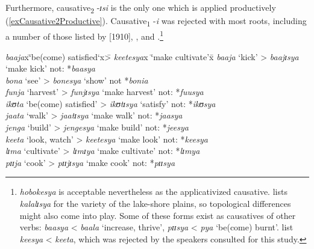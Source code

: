 Furthermore, causative\textsubscript{2} -\textit{ɪsi} is the only one which is applied productively (\ref{exCausative2Productive}). Causative\textsubscript{1} \mbox{-\textit{i}} was rejected with most roots, including a number of those listed by \citet{MeinhofC1966}[1910], \citet{SchumannK1899}, and \citet{EndemannC1914}.\footnote{\textit{hobokesya} is acceptable nevertheless as the applicativized causative. \citet{FelbergK1996} lists \textit{kalalɪsya} for the variety of the lake-shore plains, so topological differences might also come into play. Some of these forms exist as causatives of other verbs: \textit{baasya} < \textit{baala} \lq increase, thrive', \textit{pɪɪsya} < \textit{pya} \lq be(come) burnt'. \citet{MwangokaNVoorhoeveJ1960c} list \textit{keesya} < \textit{keeta}, which was rejected by the speakers consulted for this study.} 

\begin{exe}
\ex \label{exCausative2Productive}
\begin{tabbing}
\textit{baaja}x\= \lq be(come) satisfied\lq x\= > \textit{keetesya}x \= \lq make cultivate'x\= \kill %
\textit{baaja} \> \lq kick' \> > \textit{baajɪsya} \> \lq make kick' \> not: *\textit{baasya}\\
\textit{bona} \> \lq see' \> > \textit{bonesya} \> \lq show' \> not *\textit{bonia}\\%
\textit{funja} \> \lq harvest' \> > \textit{funjɪsya} \> \lq make harvest' \> not: *\textit{fuusya}\\%
\textit{ikʊta} \> \lq be(come) satisfied' \> > \textit{ikʊtɪsya} \> \lq satisfy' \> not: *\textit{ikʊsya}\\
\textit{jaata} \> \lq walk' \> > \textit{jaatɪsya} \> \lq make walk' \> not: *\textit{jaasya}\\
\textit{jenga} \> \lq build' \> > \textit{jengesya} \> \lq make build' \> not: *\textit{jeesya}\\
\textit{keeta} \> \lq look, watch' \> > \textit{keetesya} \> \lq make look' \> not: *\textit{keesya}\\%
\textit{lɪma} \> \lq cultivate' \> > \textit{lɪmɪya} \> \lq make cultivate' \> not: *\textit{lɪmya}\\
\textit{pɪɪja} \> \lq cook' \> > \textit{pɪɪjɪsya} \> \lq make cook' \> not: *\textit{pɪɪsya}
\end{tabbing}
\end{exe}


